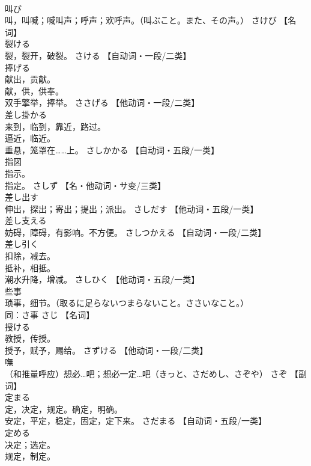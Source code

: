 \documentclass[8pt]{extreport}
\begin{document}
\begin{CJK}{UTF8}{min}
\\	叫び	
\\	叫，叫喊；喊叫声；呼声；欢呼声。（叫ぶこと。また、その声。）	さけび		【名词】
\\	裂ける	
\\	裂，裂开，破裂。	さける		【自动词・一段/二类】
\\	捧げる	
\\	献出，贡献。 
\\	献，供，供奉。 
\\	双手擎举，捧举。	ささげる		【他动词・一段/二类】
\\	差し掛かる	
\\	来到，临到，靠近，路过。 
\\	逼近，临近。 
\\	垂悬，笼罩在……上。	さしかかる		【自动词・五段/一类】
\\	指図	
\\	指示。 
\\	指定。	さしず		【名・他动词・サ变/三类】
\\	差し出す	
\\	伸出，探出；寄出；提出；派出。	さしだす		【他动词・五段/一类】
\\	差し支える	
\\	妨碍，障碍，有影响。不方便。	さしつかえる		【自动词・一段/二类】
\\	差し引く	
\\	扣除，减去。 
\\	抵补，相抵。 
\\	潮水升降，增减。	さしひく		【他动词・五段/一类】
\\	些事	
\\	琐事，细节。（取るに足らないつまらないこと。ささいなこと。） 
\\	同：さ事	さじ		【名词】
\\	授ける	
\\	教授，传授。 
\\	授予，赋予，赐给。	さずける		【他动词・一段/二类】
\\	嘸	
\\	（和推量呼应）想必…吧；想必一定…吧（きっと、さだめし、さぞや）	さぞ		【副词】
\\	定まる	
\\	定，决定，规定。确定，明确。 
\\	安定，平定，稳定，固定，定下来。	さだまる		【自动词・五段/一类】
\\	定める	
\\	决定；选定。 
\\	规定，制定。 

\end{CJK}
\end{document}

